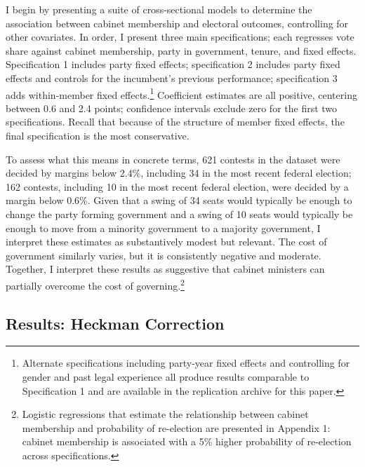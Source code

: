 \documentclass[letter,12pt]{article}
\begin{document}
I begin by presenting a suite of cross-sectional models to determine the association between cabinet membership and electoral outcomes, controlling for other covariates. In order, I present three main specifications; each regresses vote share against cabinet membership, party in government, tenure, and fixed effects. Specification 1 includes party fixed effects; specification 2 includes party fixed effects and controls for the incumbent's previous performance; specification 3 adds within-member fixed effects.\footnote{Alternate specifications including party-year fixed effects and controlling for gender and past legal experience all produce results comparable to Specification 1 and are available in the replication archive for this paper.} Coefficient estimates are all positive, centering between 0.6 and 2.4 points; confidence intervals exclude zero for the first two specifications. Recall that because of the structure of member fixed effects, the final specification is the most conservative. 

To assess what this means in concrete terms, 621 contests in the dataset were decided by margins below 2.4\%, including 34 in the most recent federal election; 162 contests, including 10 in the most recent federal election, were decided by a margin below 0.6\%. Given that a swing of 34 seats would typically be enough to change the party forming government and a swing of 10 seats would typically be enough to move from a minority government to a majority government, I interpret these estimates as substantively modest but relevant. The cost of government similarly varies, but it is consistently negative and moderate. Together, I interpret these results as suggestive that cabinet ministers can partially overcome the cost of governing.\footnote{Logistic regressions that estimate the relationship between cabinet membership and probability of re-election are presented in Appendix 1: cabinet membership is associated with a 5\% higher probability of re-election across specifications.}


\pagebreak

\subsection*{Results: Heckman Correction}
\end{document}
